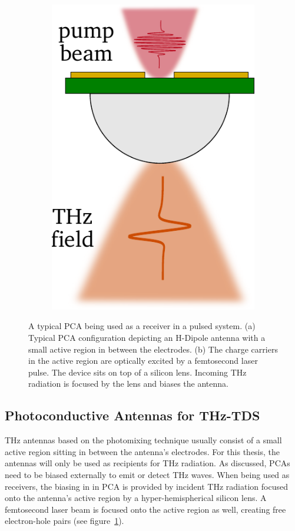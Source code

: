 \begin{figure}[!]
\begin{minipage}{0.75\textwidth}
\begin{subfigure}[t]{0.45\textwidth}
            \includegraphics[height=0.32\textheight]{figures/typ_PCA_bias.pdf}
            \caption{\centering}
            \label{fig:typPCAbias}
        \end{subfigure}
        \caption{A typical PCA being used as a receiver in a pulsed system. (a) Typical PCA configuration depicting an H-Dipole antenna with a small active region in between the electrodes. (b) The charge carriers in the active region are optically excited by a femtosecond laser pulse. The device sits on top of a silicon lens. Incoming THz radiation is focused by the lens and biases the antenna.}
        \label{fig:typPCA}
    \end{minipage}
\end{figure}

\subsection{Photoconductive Antennas for THz-TDS}

THz antennas based on the photomixing technique usually consist of a small active region sitting in between the antenna's electrodes. For this thesis, the antennas will only be used as recipients for THz radiation. As discussed, PCAs need to be biased externally to emit or detect THz waves. When being used as receivers, the biasing in in PCA is provided by incident THz radiation focused onto the antenna's active region by a hyper-hemispherical silicon lens. A femtosecond laser beam is focused onto the active region as well, creating free electron-hole pairs (see figure~\ref{fig:typPCAbias}).

